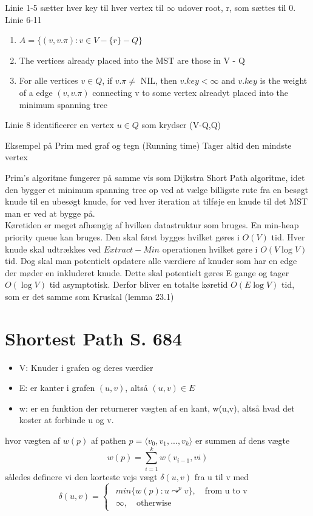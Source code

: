 \documentclass[11pt,a4paper]{report}
\theoremstyle{plain}
\theoremstyle{definition}
\theoremstyle{remark}
\numberwithin{equation}{section}
\begin{document}
Linie 1-5 sætter hver key til hver vertex til $\infty$ udover root, r, som sættes til 0.\\
Linie 6-11
\begin{enumerate}
  \item $A = \{(v,v.\pi) : v \in V - \{r\} - Q \}$
  \item The vertices already placed into the MST are those in V - Q
  \item For alle vertices $v \in Q$, if $v.\pi \neq $ NIL, then $v.key < \infty$ and $v.key$ is the weight of a edge $(v,v.\pi)$ connecting v to some vertex alreadyt placed into the minimum spanning tree
\end{enumerate}

Linie 8 identificerer en vertex $u \in Q$ som krydser (V-Q,Q)

Eksempel på Prim med graf og tegn (Running time)
Tager altid den mindste vertex

Prim's algoritme fungerer på samme vis som Dijkstra Short Path algoritme, idet den bygger et minimum spanning tree op ved at vælge billigste rute fra en besøgt knude til en ubesøgt knude, for ved hver iteration at tilføje en knude til det MST man er ved at bygge på.\\
Køretiden er meget afhængig af hvilken datastruktur som bruges. En min-heap priority queue kan bruges. Den skal først bygges hvilket gøres i $O(V)$ tid. Hver knude skal udtrækkes ved $Extract-Min$ operationen hvilket gøre i $O(V \log V)$ tid. Dog skal man potentielt opdatere alle værdiere af knuder som har en edge der møder en inkluderet knude. Dette skal potentielt gøres E gange og tager $O(\log V)$ tid asymptotisk. Derfor bliver en totalte køretid $O(E \log V)$ tid, som er det samme som Kruskal (lemma 23.1)

\chapter{Shortest Path S. 684}
\begin{itemize}
  \item V: Knuder i grafen og deres værdier
  \item E: er kanter i grafen $(u, v)$, altså $(u, v) \in E$
  \item w: er en funktion der returnerer vægten af en kant, w(u,v), altså hvad det koster at forbinde u og v.
\end{itemize}

hvor vægten af $w(p)$ af pathen $p = \langle v_0, v_1, ... , v_k \rangle$ er summen af dens vægte
\[
w(p) = \sum^k_{i=1} w(v_{i-1},vi)
\]
således definere vi den korteste vejs vægt $\delta(u,v)$ fra u til v med
\[
\delta(u,v) =
\begin{cases}
              \begin{array}{c}
                min\{w(p):u \leadsto^{p} v\}, \quad \text{from u to v } \\
                \infty, \quad \text{otherwise}
              \end{array}
              \end{cases}
\]
\end{document}
